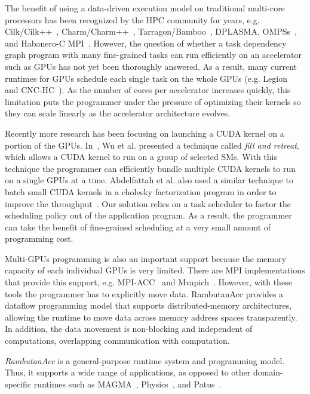 The benefit of using a data-driven execution model on traditional multi-core processors has been recognized by the HPC community for years, e.g. Cilk/Cilk++~\cite{cilk,BlumofeJoKu95}, Charm/Charm++~\cite{charm++}, Tarragon/Bamboo~\cite{cicotti11:dissertation,bamboo, bamboo-LU, bambooThesis}, DPLASMA\cite{dplasma,Bosilca:2012:DAGuE}, OMPSs~\cite{ompss,nexus}, and Habanero-C MPI~\cite{Chatterjee:2013:HCMPI}.
However, the question of whether a task dependency graph program with many fine-grained tasks can run efficiently on an accelerator such as GPUs has not yet been thoroughly answered.
As a result, many current runtimes for GPUs schedule each single task on the whole GPUs (e.g. Legion~\cite{legion} and CNC-HC~\cite{cnc-hc}).
As the number of cores per accelerator increases quickly, this limitation puts the programmer under the pressure of optimizing their kernels so they can scale linearly as the accelerator architecture evolves.

Recently more research has been focusing on launching a CUDA kernel on a portion of the GPUs.
In~\cite{fillNRetreat}, Wu et al. presented a technique called {\em fill and retreat}, which allows a CUDA kernel to run on a group of selected SMs.
With this technique the programmer can efficiently bundle multiple CUDA kernels to run on a single GPUs at a time.
Abdelfattah et al. also used a similar technique to batch small CUDA kernels in a cholesky factorization program in order to improve the throughput~\cite{batchedCholesky}.
Our solution relies on a task scheduler to factor the scheduling policy out of the application program.
As a result, the programmer can take the benefit of fine-grained scheduling at a very small amount of programming cost.

Multi-GPUs programming is also an important support because the memory capacity of each individual GPUs is very limited.
There are MPI implementations that provide this support, e.g. MPI-ACC~\cite{mpiacc, mpiacc1} and Mvapich~\cite{mvapich2gpu}.
However, with these tools the programmer has to explicitly move data.
RambutanAcc provides a dataflow programming model that supports distributed-memory architectures, allowing the runtime to move data across memory address spaces transparently.
In addition, the data movement is non-blocking and independent of computations, overlapping communication with computation.

{\em RambutanAcc} is a general-purpose runtime system and programming model.
Thus, it supports a wide range of applications, as opposed to other domain-specific runtimes such as MAGMA~\cite{MAGMA}, Physics~\cite{physics}, and Patus~\cite{patus}.

